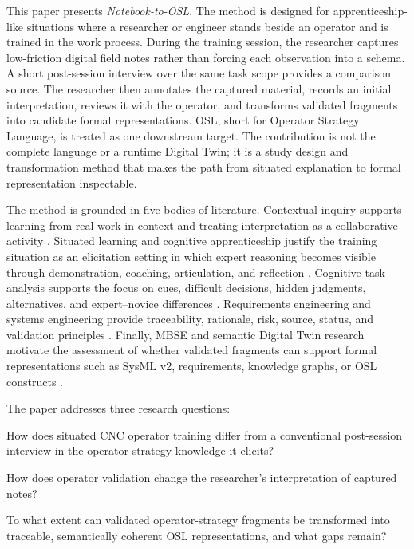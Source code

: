 This paper presents \emph{Notebook-to-OSL}. The method is designed for apprenticeship-like situations where a researcher or engineer stands beside an operator and is trained in the work process. During the training session, the researcher captures low-friction digital field notes rather than forcing each observation into a schema. A short post-session interview over the same task scope provides a comparison source. The researcher then annotates the captured material, records an initial interpretation, reviews it with the operator, and transforms validated fragments into candidate formal representations. OSL, short for Operator Strategy Language, is treated as one downstream target. The contribution is not the complete language or a runtime Digital Twin; it is a study design and transformation method that makes the path from situated explanation to formal representation inspectable.

The method is grounded in five bodies of literature. Contextual inquiry supports learning from real work in context and treating interpretation as a collaborative activity \cite{beyer1995apprenticing,beyer1997contextual}. Situated learning and cognitive apprenticeship justify the training situation as an elicitation setting in which expert reasoning becomes visible through demonstration, coaching, articulation, and reflection \cite{lave1991situated,collins1989cognitive}. Cognitive task analysis supports the focus on cues, difficult decisions, hidden judgments, alternatives, and expert--novice differences \cite{crandall2006workingminds,klein1989critical,stanik2021acta}. Requirements engineering and systems engineering provide traceability, rationale, risk, source, status, and validation principles \cite{vanlamsweerde2009requirements,sebokStakeholder,sebokRequirements}. Finally, MBSE and semantic Digital Twin research motivate the assessment of whether validated fragments can support formal representations such as SysML v2, requirements, knowledge graphs, or OSL constructs \cite{omgSysml2024,karabulut2023ontologies,listl2024knowledge,braun2022graph}.

The paper addresses three research questions:

\begin{description}[leftmargin=2.4cm,style=nextline]
    \item[RQ1] How does situated CNC operator training differ from a conventional post-session interview in the operator-strategy knowledge it elicits?
    \item[RQ2] How does operator validation change the researcher's interpretation of captured notes?
    \item[RQ3] To what extent can validated operator-strategy fragments be transformed into traceable, semantically coherent OSL representations, and what gaps remain?
\end{description}

